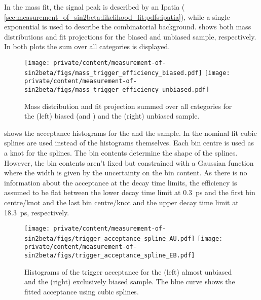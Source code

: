 In the mass fit, the signal peak is described by an Ipatia \PDF (\cf
\cref{sec:measurement_of_sin2beta:likelihood_fit:pdfs:ipatia}), while a single
exponential is used to describe the combinatorial background.
shows both mass distributions and fit projections for the biased and unbiased
sample, respectively. In both plots the sum over all categories is displayed.
%
\begin{figure}
\texttt{[image: private/content/measurement-of-sin2beta/figs/mass\_trigger\_efficiency\_biased.pdf]}
\texttt{[image: private/content/measurement-of-sin2beta/figs/mass\_trigger\_efficiency\_unbiased.pdf]}
\caption{Mass distribution and fit projection summed over all categories for
the (left) biased (\catAU and \catEB) and the (right) unbiased sample.}
\label{fig:measurement_of_sin2beta:resolution_and_acceptance:acceptance:lower:mass_fits}
\end{figure}
%
shows the acceptance histograms for the \catAU and the \catEB sample. In the
nominal fit cubic splines \cite{Karbach:2014qba} are used instead of the
histograms themselves. Each bin centre is used as a knot for the splines. The
bin contents determine the shape of the splines. However, the bin contents
aren't fixed but constrained with a Gaussian function where the width is given
by the uncertainty on the bin content. As there is no information about the
acceptance at the decay time limits, the efficiency is assumed to be flat
between the lower decay time limit at \SI{0.3}{\ps} and the first bin
centre/knot and the last bin centre/knot and the upper decay time limit at
\SI{18.3}{\ps}, respectively.
%
\begin{figure}
\texttt{[image: private/content/measurement-of-sin2beta/figs/trigger\_acceptance\_spline\_AU.pdf]}
\texttt{[image: private/content/measurement-of-sin2beta/figs/trigger\_acceptance\_spline\_EB.pdf]}
\caption{Histograms of the trigger acceptance for the (left) almost unbiased and
the (right) exclusively biased sample. The blue curve shows the fitted
acceptance using cubic splines.}
\label{fig:measurement_of_sin2beta:resolution_and_acceptance:acceptance:lower:splines}
\end{figure}

